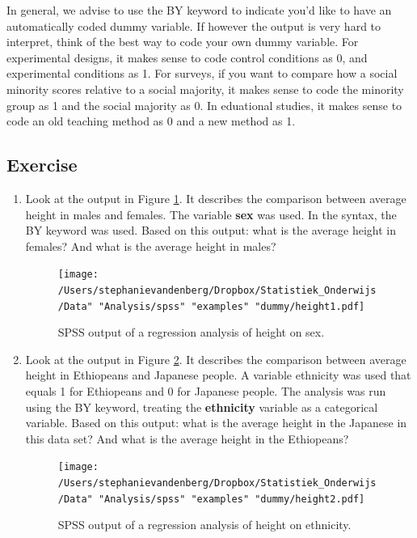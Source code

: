 \documentclass[]{book}\usepackage[]{graphicx}\usepackage[]{color}
\begin{document}
In general, we advise to use the BY keyword to indicate you'd like to have an automatically coded dummy variable. If however the output is very hard to interpret, think of the best way to code your own dummy variable. For experimental designs, it makes sense to code control conditions as 0, and experimental conditions as 1. For surveys, if you want to compare how a social minority scores relative to a social majority, it makes sense to code the minority group as 1 and the social majority as 0. In eduational studies, it makes sense to code an old teaching method as 0 and a new method as 1.  

\subsection{Exercise}

\begin{enumerate}

\item Look at the output in Figure \ref{fig:dummy_12}. It describes the comparison between average height in males and females. The variable \textbf{sex} was used. In the syntax, the BY keyword was used. Based on this output: what is the average height in females? And what is the average height in males?

\begin{figure}[h]
    \begin{center}
       \texttt{[image: /Users/stephanievandenberg/Dropbox/Statistiek\_Onderwijs/Data" "Analysis/spss" "examples" "dummy/height1.pdf]}
    \end{center}
 \caption{SPSS output of a regression analysis of height on sex.}
 \label{fig:dummy_12}
\end{figure}

\item Look at the output in Figure \ref{fig:dummy_13}. It describes the comparison between average height in Ethiopeans and Japanese people. A variable ethnicity was used that equals 1 for Ethiopeans and 0 for Japanese people. The analysis was run using the BY keyword, treating the \textbf{ethnicity} variable as a categorical variable. Based on this output: what is the average height in the Japanese in this data set? And what is the average height in the Ethiopeans?

\begin{figure}[h]
    \begin{center}
       \texttt{[image: /Users/stephanievandenberg/Dropbox/Statistiek\_Onderwijs/Data" "Analysis/spss" "examples" "dummy/height2.pdf]}
    \end{center}
 \caption{SPSS output of a regression analysis of height on ethnicity.}
 \label{fig:dummy_13}
\end{figure}


\end{enumerate}
\end{document}
